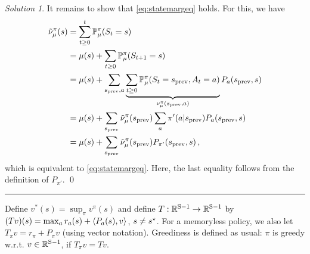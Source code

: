 \documentclass{article}
\newcommand{\R}{\mathbb{R}}
\DeclareMathOperator*{\1}{\mathbbm{1}}
\theoremstyle{definition}
\theoremstyle{remark}
\newtheorem*{solution*}{Solution}
\begin{document}
\begin{solution*}
It remains to show that \eqref{eq:statemargeq} holds. For this, we have
\begin{align*}
\tilde \nu_\mu^\pi(s)
& = \sum_{t\ge 0} ^t \mathbb{P}_\mu^\pi(S_t=s) \\
& = \mu(s) +  \sum_{t\ge 0} \mathbb{P}_\mu^\pi(S_{t+1}=s) \\
& = \mu(s) +  \sum_{s_{\text{prev}},a} \underbrace{\sum_{t\ge 0}  \mathbb{P}_\mu^\pi(S_{t}=s_{\text{prev}},A_t=a)}_{\nu_\mu^\pi(s_{\text{prev}},a)} P_{a}(s_{\text{prev}},s) \\
& = \mu(s) +  \sum_{s_{\text{prev}}} \tilde \nu_\mu^\pi(s_{\text{prev}}) \sum_a \pi'(a|s_{\text{prev}}) P_{a}(s_{\text{prev}},s) \\
& = \mu(s) +  \sum_{s_{\text{prev}}} \tilde \nu_\mu^\pi(s_{\text{prev}}) P_{\pi'}(s_{\text{prev}},s)\,,
\end{align*}
which is equivalent to \eqref{eq:statemargeq}. Here, the last equality follows from 
the definition of $P_{\pi'}$.
\qed\par\smallskip\hrule
\end{solution*}

Define $v^*(s) = \sup_{\pi} v^\pi(s)$ and define 
$T: \R^{\nS-1} \to \R^{\nS-1}$ by
$(T v)(s) = \max_a r_a(s) + \langle P_a(s),v \rangle$, $s\ne s^{\star}$.
For a memoryless policy, we also let $T_\pi v = r_\pi + P_\pi v$ (using vector notation).
Greediness is defined as usual: $\pi$ is greedy w.r.t. $v\in \R^{\nS-1}$, if $T_\pi v = T v$.
\end{document}
